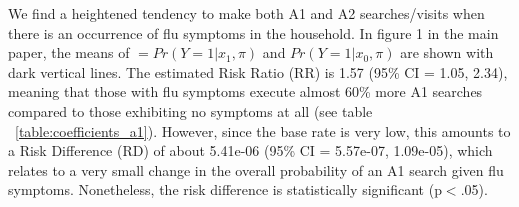 \documentclass[12pt]{article}
\begin{document}


We find a heightened tendency to make both A1 and A2  searches/visits when there is an occurrence of flu symptoms in the household. In figure 1 in the main paper, the means of $ = Pr(Y=1|x_1, \pi)$ and $ Pr(Y=1|x_0, \pi) $ are shown with dark vertical lines. The estimated Risk Ratio (RR) is 1.57 (95\% CI = 1.05, 2.34), meaning that those with flu symptoms execute almost 60\% more A1 searches compared to those exhibiting no symptoms at all (see table ~\ref{table:coefficients_a1}). However, since the base rate is very low, this amounts to a Risk Difference (RD) of about 5.41e-06 (95\% CI = 5.57e-07, 1.09e-05), which relates to a very small change in the overall probability of an A1 search given flu symptoms. Nonetheless, the risk difference is statistically significant (p$<$.05). 



\end{document}
